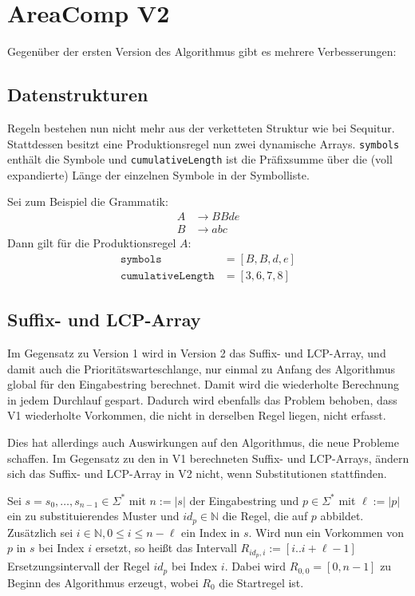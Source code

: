 \section{AreaComp V2}


Gegenüber der ersten Version des Algorithmus gibt es mehrere Verbesserungen:

\subsection{Datenstrukturen} Regeln bestehen nun nicht mehr aus der verketteten Struktur wie bei Sequitur. Stattdessen besitzt eine Produktionsregel nun zwei dynamische Arrays. \texttt{symbols} enthält die Symbole und \texttt{cumulativeLength} ist die Präfixsumme über die (voll expandierte) Länge der einzelnen Symbole in der Symbolliste.

Sei zum Beispiel die Grammatik: 
\begin{align*}
	A &\rightarrow BBde\\
	B &\rightarrow abc
\end{align*}
Dann gilt für die Produktionsregel $A$: 
\begin{align*}
	\texttt{symbols} &= [B, B, d, e]\\
	\texttt{cumulativeLength} &= [3, 6, 7, 8]
\end{align*}

\subsection{Suffix- und LCP-Array}
Im Gegensatz zu Version 1 wird in Version 2 das Suffix- und LCP-Array, und damit auch die Prioritätswarteschlange, nur einmal zu Anfang des Algorithmus global für den Eingabestring berechnet. Damit wird die wiederholte Berechnung in jedem Durchlauf gespart. 
Dadurch wird ebenfalls das Problem behoben, dass V1 wiederholte Vorkommen, die nicht in derselben Regel liegen, nicht erfasst.

Dies hat allerdings auch Auswirkungen auf den Algorithmus, die neue Probleme schaffen. Im Gegensatz zu den in V1 berechneten Suffix- und LCP-Arrays, ändern sich das Suffix- und LCP-Array in V2 nicht, wenn Substitutionen stattfinden. 

Sei $s = s_0, \dots, s_{n-1} \in \Sigma^*$ mit $n := |s|$ der Eingabestring und $p \in \Sigma^*$ mit $\ell := |p|$  ein zu substituierendes Muster und $id_p \in \mathbb{N}$ die Regel, die auf $p$ abbildet. Zusätzlich sei $i \in \mathbb{N}, 0 \leq i \leq n - \ell$ ein Index in $s$. Wird nun ein Vorkommen von $p$ in $s$ bei Index $i$ ersetzt, so heißt das Intervall $R_{id_p, i} := [i.. i + \ell - 1]$ Ersetzungsintervall der Regel $id_p$ bei Index $i$. Dabei wird $R_{0, 0} = [0, n-1]$ zu Beginn des Algorithmus erzeugt, wobei $R_0$ die Startregel ist.

